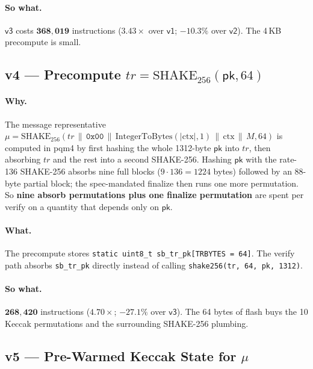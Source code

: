 \documentclass[11pt,a4paper]{article}
\newcommand{\SHAKE}{\mathrm{SHAKE}}
\begin{document}
\paragraph{So what.} $\textsf{v3}$ costs $\mathbf{368{,}019}$ instructions
($\mathbf{3.43\times}$ over $\textsf{v1}$; $-10.3\%$ over $\textsf{v2}$).
The 4\,KB precompute is small.

\subsection{v4 --- Precompute \texorpdfstring{$tr = \SHAKE_{256}(\textsf{pk}, 64)$}{tr = SHAKE-256(pk, 64)}}

\paragraph{Why.} The message representative
$\mu = \SHAKE_{256}(tr \,\|\, \mathtt{0x00} \,\|\, \mathrm{IntegerToBytes}(|\mathrm{ctx}|,1) \,\|\, \mathrm{ctx} \,\|\, M, 64)$
is computed in pqm4 by first hashing the whole 1312-byte $\textsf{pk}$
into $tr$, then absorbing $tr$ and the rest into a second SHAKE-256.
Hashing $\textsf{pk}$ with the rate-136 SHAKE-256 absorbs nine full
blocks ($9 \cdot 136 = 1224$ bytes) followed by an 88-byte partial
block; the spec-mandated finalize then runs one more permutation. So
\textbf{nine absorb permutations plus one finalize permutation} are
spent per verify on a quantity that depends only on $\textsf{pk}$.

\paragraph{What.} The precompute stores
\texttt{static uint8\_t sb\_tr\_pk[TRBYTES = 64]}. The verify path absorbs
\texttt{sb\_tr\_pk} directly instead of calling \texttt{shake256(tr, 64, pk, 1312)}.

\paragraph{So what.} $\mathbf{268{,}420}$ instructions ($\mathbf{4.70\times}$;
$-27.1\%$ over $\textsf{v3}$). The 64 bytes of flash buys the 10
Keccak permutations and the surrounding SHAKE-256 plumbing.

\subsection{v5 --- Pre-Warmed Keccak State for \texorpdfstring{$\mu$}{mu}}
\end{document}
